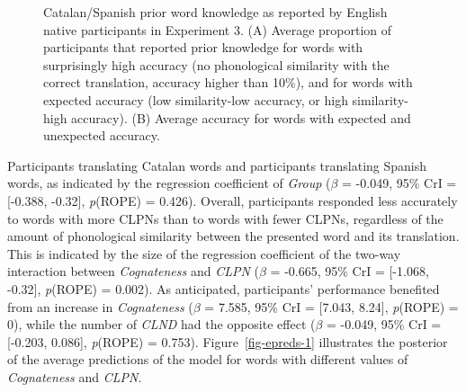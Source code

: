 \documentclass[
]{article}
\begin{document}
\begin{figure}


\caption{\label{fig-knowledge}Catalan/Spanish prior word knowledge as
reported by English native participants in Experiment 3. (A) Average
proportion of participants that reported prior knowledge for words with
surprisingly high accuracy (no phonological similarity with the correct
translation, accuracy higher than 10\%), and for words with expected
accuracy (low similarity-low accuracy, or high similarity-high
accuracy). (B) Average accuracy for words with expected and unexpected
accuracy.}

\end{figure}%

Participants translating Catalan words and participants translating
Spanish words, as indicated by the regression coefficient of
\emph{Group} (\(\beta\) = -0.049, 95\% CrI = {[}-0.388, -0.32{]},
\emph{p}(ROPE) = 0.426). Overall, participants responded less accurately
to words with more CLPNs than to words with fewer CLPNs, regardless of
the amount of phonological similarity between the presented word and its
translation. This is indicated by the size of the regression coefficient
of the two-way interaction between \emph{Cognateness} and \emph{CLPN}
(\(\beta\) = -0.665, 95\% CrI = {[}-1.068, -0.32{]}, \emph{p}(ROPE) =
0.002). As anticipated, participants' performance benefited from an
increase in \emph{Cognateness} (\(\beta\) = 7.585, 95\% CrI = {[}7.043,
8.24{]}, \emph{p}(ROPE) = 0), while the number of \emph{CLND} had the
opposite effect (\(\beta\) = -0.049, 95\% CrI = {[}-0.203, 0.086{]},
\emph{p}(ROPE) = 0.753). Figure~\ref{fig-epreds-1} illustrates the
posterior of the average predictions of the model for words with
different values of \emph{Cognateness} and \emph{CLPN}.

\begin{figure}


\caption{\label{fig-epreds-3}}

\end{figure}%
\end{document}
